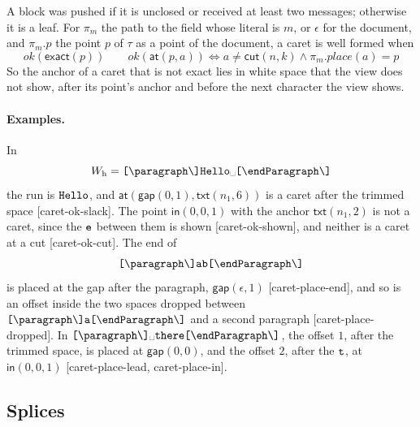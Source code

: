 \documentclass[11pt]{article}
\numberwithin{equation}{section}
\newcommand{\kw}[1]{\ensuremath{\mathsf{#1}}}
\newcommand{\str}[1]{\ensuremath{\text{\texttt{#1}}}}
\newcommand{\bs}{\textbackslash}
\newcommand{\vs}{\text{\textvisiblespace}}
\begin{document}
A block was pushed if it is unclosed or received at least two messages;
otherwise it is a leaf.  For $\pi_m$ the path to the field whose literal is
$m$, or $\epsilon$ for the document, and $\pi_m.p$ the point $p$ of $\tau$
as a point of the document, a caret is well formed when
\begin{equation}\label{eq:caret-ok}
\mathit{ok}(\kw{exact}(p))
\qquad
\mathit{ok}(\kw{at}(p, a)) \iff a \neq \kw{cut}(n, k) \wedge
  \pi_m.\mathit{place}(a) = p
\end{equation}
So the anchor of a caret that is not exact lies in white space that the
view does not show, after its point's anchor and before the next character
the view shows.

\paragraph{Examples.}  In
\[
W_{\mathrm{h}} = \str{[\bs{}paragraph\bs]Hello}\vs\str{[\bs{}endParagraph\bs]}
\]
the run is $\str{Hello}$, and $\kw{at}(\kw{gap}(0, 1), \kw{txt}(n_1, 6))$ is a caret
after the trimmed space [caret-ok-slack].  The point $\kw{in}(0, 0, 1)$
with the anchor $\kw{txt}(n_1, 2)$ is not a caret, since the $\str{e}$
between them is shown [caret-ok-shown], and neither is a caret at a cut
[caret-ok-cut].  The end of
\[
\str{[\bs{}paragraph\bs]ab[\bs{}endParagraph\bs]}
\]
is placed at the gap after the paragraph, $\kw{gap}(\epsilon, 1)$ [caret-place-end], and so is
an offset inside the two spaces dropped between
$\str{[\bs{}paragraph\bs]a[\bs{}endParagraph\bs]}$ and a second paragraph
[caret-place-dropped].  In
$\str{[\bs{}paragraph\bs]}\vs\str{there[\bs{}endParagraph\bs]}$, the
offset $1$, after the trimmed space, is placed at $\kw{gap}(0, 0)$, and the offset
$2$, after the $\str{t}$, at $\kw{in}(0, 0, 1)$ [caret-place-lead,
caret-place-in].

\subsection{Splices}
\end{document}
